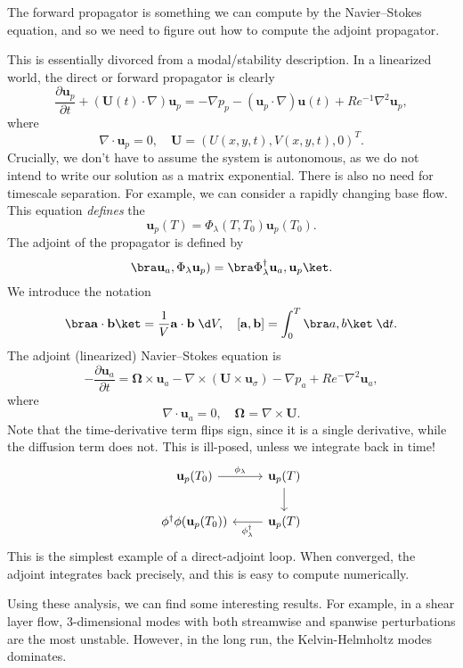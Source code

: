 \documentclass[a4paper]{article}
\begin{document}
The forward propagator is something we can compute by the Navier--Stokes equation, and so we need to figure out how to compute the adjoint propagator.

This is essentially divorced from a modal/stability description. In a linearized world, the direct or forward propagator is clearly
\[
  \frac{\partial \mathbf{u}_p}{\partial t} + (\mathbf{U}(t) \cdot \nabla) \mathbf{u}_p = -\nabla p_p - (\mathbf{u}_p \cdot \nabla) \mathbf{u}(t) + Re^{-1} \nabla^2 \mathbf{u}_p,
\]
where
\[
  \nabla \cdot \mathbf{u}_p = 0,\quad \mathbf{U} = (U(x, y, t), V(x, y, t), 0)^T.
\]
Crucially, we don't have to assume the system is autonomous, as we do not intend to write our solution as a matrix exponential. There is also no need for timescale separation. For example, we can consider a rapidly changing base flow. This equation \emph{defines} the 
\[
  \mathbf{u}_p(T) = \Phi_\lambda (T, T_0) \mathbf{u}_p(T_0).
\]
The adjoint of the propagator is defined by
\[
  \bra \mathbf{u}_a, \Phi_\lambda \mathbf{u}_p) = \bra \Phi_\lambda^\dagger \mathbf{u}_a, \mathbf{u}_p\ket.
\]
We introduce the notation
\[
  \bra \mathbf{a} \cdot \mathbf{b}\ket = \frac{1}{V} \mathbf{a} \cdot \mathbf{b} \;\d V,\quad [\mathbf{a}, \mathbf{b}] = \int_0^T \bra a, b \ket \;\d t.
\]
The adjoint (linearized) Navier--Stokes equation is
\[
  -\frac{\partial \mathbf{u}_a}{\partial t} = \boldsymbol\Omega \times \mathbf{u}_a - \nabla \times (\mathbf{U} \times \mathbf{u}_\sigma) - \nabla p_a + Re^{-} \nabla^2 \mathbf{u}_a,
\]
where 
\[
  \nabla \cdot \mathbf{u}_a = 0,\quad \boldsymbol\Omega = \nabla \times \mathbf{U}.
\]
Note that the time-derivative term flips sign, since it is a single derivative, while the diffusion term does not. This is ill-posed, unless we integrate back in time!
\[
  \begin{tikzcd}
    \mathbf{u}_p(T_0) \ar[r, "\phi_\lambda"] & \mathbf{u}_p(T) \ar[d]\\
    \phi^\dagger \phi (\mathbf{u}_p(T_0)) & \mathbf{u}_p(T) \ar[l, "\phi_{\lambda}^\dagger"]
  \end{tikzcd}
\]
This is the simplest example of a direct-adjoint loop. When converged, the adjoint integrates back precisely, and this is easy to compute numerically.

Using these analysis, we can find some interesting results. For example, in a shear layer flow, 3-dimensional modes with both streamwise and spanwise perturbations are the most unstable. However, in the long run, the Kelvin-Helmholtz modes dominates.
\end{document}
